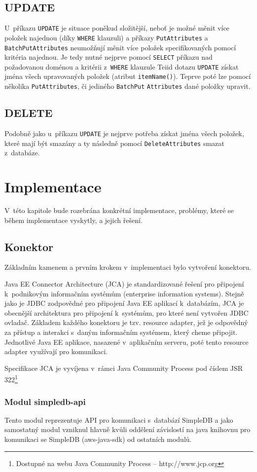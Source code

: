 \documentclass[oneside,12pt]{fithesis2}
\begin{document}
\section{UPDATE}
U~příkazu \verb<UPDATE< je situace poněkud složitější, neboť je možné měnit více položek najednou (díky \verb<WHERE< klauzuli) a příkazy \verb<PutAttributes< a \verb<BatchPutAttributes< neumožňují měnit více položek specifikovaných pomocí kritéria najednou. Je tedy nutné nejprve pomocí \verb<SELECT< příkazu nad požadovanou doménou a kritérii z~\verb<WHERE< klauzule Teiid dotazu \verb<UPDATE< získat jména všech upravovaných položek (atribut \verb<itemName()<). Teprve poté lze pomocí několika \verb<PutAttributes<, či jediného \verb<BatchPut< \verb<Attributes< dané položky upravit.
\section{DELETE}
Podobně jako u~příkazu \verb<UPDATE< je nejprve potřeba získat jména všech položek, které mají být smazány a ty následně pomocí \verb<DeleteAttributes< smazat z~databáze.
\chapter{Implementace}
\label{implementace}
V~této kapitole bude rozebrána konkrétní implementace, problémy, které se během implementace vyskytly, a jejich řešení.
\section{Konektor}
Základním kamenem a prvním krokem v~implementaci bylo vytvoření konektoru.

Java EE Connector Architecture (JCA) je standardizované řešení pro připojení k~podnikovým informačním systémům (enterprise information systems). Stejně jako je JDBC zodpovědné pro připojení Java EE aplikací k~databázím, JCA je obecnější architektura pro připojení k~systémům, pro které není vytvořen JDBC ovladač. Základem každého konektoru je tzv. resource adapter, jež je odpovědný za přístup a interakci s~daným informačním systémem, který cheme připojit. Jednotlivé Java EE aplikace, nasazené v~aplikačním serveru, poté tento resource adapter využívají pro komunikaci. 

Specifikace JCA je vyvíjena v~rámci Java Community Process pod číslem JSR 322\footnote{Dostupné na webu Java Community Process -- http://www.jcp.org}
\subsection{Modul simpledb-api}
Tento modul reprezentuje API pro komunikaci s~databází SimpleDB a jako samostatný modul vzniknul hlavně kvůli oddělení závislostí na java knihovnu pro komunikaci se SimpleDB (aws-java-sdk) od ostatních modulů.
\end{document}
